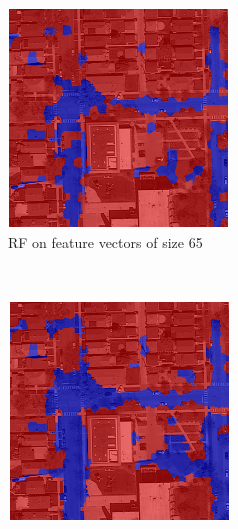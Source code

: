 \documentclass[10pt,conference,compsocconf]{IEEEtran}
\begin{document}
\begin{figure}[!h]
	\begin{subfigure}[b]{0.12\textwidth}
		\includegraphics[width=\textwidth]{RF2.png}
		\caption{RF on feature vectors of size 65}
	\end{subfigure}
	~ %
	\begin{subfigure}[b]{0.12\textwidth}
		\includegraphics[width=\textwidth]{RFrefined2.png}

\end{subfigure}
\end{figure}
\end{document}
